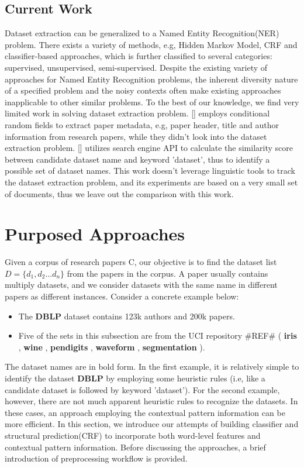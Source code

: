 \documentclass[11pt]{article}
\begin{document}
\subsection{Current Work}
Dataset extraction can be generalized to a Named Entity Recognition(NER) problem. There exists a variety of methods, e.g, Hidden Markov Model, CRF and classifier-based approaches, which is further classified to several categories: supervised, unsupervised, semi-supervised. Despite the existing variety of approaches for Named Entity Recognition problems, the inherent diversity nature of a specified problem and the noisy contexts often make existing approaches inapplicable to other similar problems. To the best of our knowledge, we find very limited work in solving dataset extraction problem. [] employs conditional random fields to extract paper metadata, e.g, paper header, title and author information from research papers, while they didn't look into the dataset extraction problem. [] utilizes search engine API to calculate the similarity score between candidate dataset name and keyword 'dataset', thus to identify a possible set of dataset names. This work doesn't leverage linguistic tools to track the dataset extraction problem, and its experiments are based on a very small set of documents, thus we leave out the comparison with this work. 

\section{Purposed Approaches}
Given a corpus of research papers C, our objective is to find the dataset list $D = \{ d_1, d_2...d_n\}$ from the papers in the corpus. A paper usually contains multiply datasets, and we consider datasets with the same name in different papers as different instances. Consider a concrete example below: 
\begin{itemize}
\item The \textbf{DBLP} dataset contains 123k authors and 200k papers. 
\item Five of the sets in this subsection are from the UCI repository \#REF\# ( \textbf{iris} , \textbf{wine} , \textbf{pendigits} , \textbf{waveform} , \textbf{segmentation} ).
\end{itemize}
The dataset names are in bold form. In the first example, it is relatively simple to identify the dataset \textbf{DBLP} by employing some heuristic rules (i.e, like a candidate dataset is followed by keyword 'dataset'). For the second example, however, there are not much apparent heuristic rules to recognize 
the datasets. In these cases, an approach employing the contextual pattern information can be more efficient. In this section, we introduce our attempts of building classifier and structural prediction(CRF) to incorporate both word-level features and contextual pattern information. Before discussing the approaches, a brief introduction of preprocessing workflow is provided. 
\end{document}
